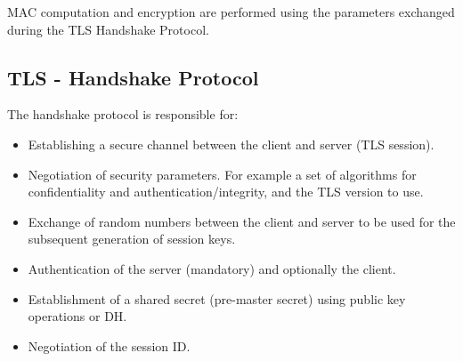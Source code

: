 \begin{tcolorbox}[colback=red!10!white, colframe=red!70!black, coltitle=white, title=Beware]
    MAC computation and encryption are performed using the parameters exchanged during the TLS Handshake Protocol.
\end{tcolorbox}

\subsection{TLS - Handshake Protocol}
The handshake protocol is responsible for:
\begin{itemize}
    \item Establishing a secure channel between the client and server (TLS session).
    \item Negotiation of security parameters. For example a set of algorithms for confidentiality and authentication/integrity, and the TLS version to use.
    \item Exchange of random numbers between the client and server to be used for the subsequent generation of session keys.
    \item Authentication of the server (mandatory) and optionally the client.
    \item Establishment of a shared secret (pre-master secret) using public key operations or DH.
    \item Negotiation of the session ID.
\end{itemize}


